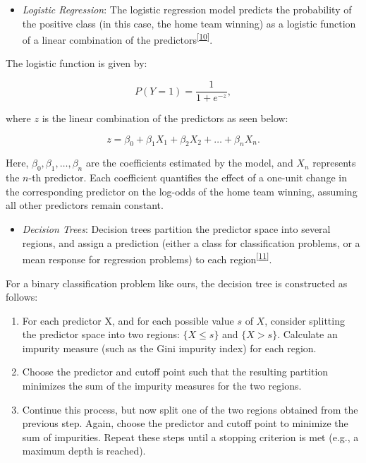 \documentclass[
  12pt,
  a4paper,
]{article}
\providecommand{\tightlist}{%
  \setlength{\itemsep}{0pt}\setlength{\parskip}{0pt}}
\begin{document}
\begin{itemize}
\tightlist
\item
  \emph{Logistic Regression}: The logistic regression model predicts the probability of the positive class (in this case, the home team winning) as a logistic function of a linear combination of the predictors\textsuperscript{{[}\protect\hyperlink{ref-AppLog}{10}{]}}.
\end{itemize}

The logistic function is given by:

\[P(Y=1) = \frac{1}{1 + e^{-z}},\]

where \(z\) is the linear combination of the predictors as seen below:

\[z = \beta_0 + \beta_1 X_1 + \beta_2 X_2 + \dots + \beta_n X_n.\]

Here, \(\beta_0, \beta_1, \dots, \beta_n\) are the coefficients estimated by the model, and \(X_n\) represents the \(n\)-th predictor. Each coefficient quantifies the effect of a one-unit change in the corresponding predictor on the log-odds of the home team winning, assuming all other predictors remain constant.

\begin{itemize}
\tightlist
\item
  \emph{Decision Trees}: Decision trees partition the predictor space into several regions, and assign a prediction (either a class for classification problems, or a mean response for regression problems) to each region\textsuperscript{{[}\protect\hyperlink{ref-QuinlanDT}{11}{]}}.
\end{itemize}

For a binary classification problem like ours, the decision tree is constructed as follows:

\begin{enumerate}
\def\labelenumi{\arabic{enumi}.}
\tightlist
\item
  For each predictor X, and for each possible value \(s\) of \(X\), consider splitting the predictor space into two regions: \(\{X \leq s\}\) and \(\{X > s\}\). Calculate an impurity measure (such as the Gini impurity index) for each region.
\item
  Choose the predictor and cutoff point such that the resulting partition minimizes the sum of the impurity measures for the two regions.
\item
  Continue this process, but now split one of the two regions obtained from the previous step. Again, choose the predictor and cutoff point to minimize the sum of impurities.
  Repeat these steps until a stopping criterion is met (e.g., a maximum depth is reached).
\end{enumerate}
\end{document}
